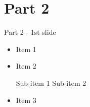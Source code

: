 \section{Part 2}

\begin{frame}{Part 2 - 1st slide}
    \begin{itemize}
        \item Item 1
        \vfill
        \item Item 2
        \begin{itemize}
            \arrowitem Sub-item 1
            \smallskip
            \arrowitem Sub-item 2
        \end{itemize}
        \vfill
        \item Item 3
        \vfill
    \end{itemize}
\end{frame}
